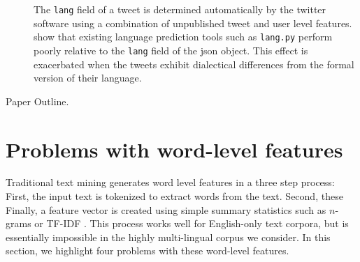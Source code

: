 \documentclass[sigconf,10pt]{acmart}
\newcommand{\str}[1]{\texttt{#1}}
\begin{document}
\begin{description}
The \str{lang} field of a tweet is determined automatically by the twitter software using a combination of unpublished tweet and user level features.
\citet{blodgett2016demographic} show that existing language prediction tools such as \str{lang.py} \citep{lui2012langid} perform poorly relative to the \str{lang} field of the json object.
This effect is exacerbated when the tweets exhibit dialectical differences from the formal version of their language.

\item[Paper Outline.]

\end{description}

%

\section{Problems with word-level features}

Traditional text mining generates word level features in a three step process:
First, the input text is tokenized to extract words from the text.
Second, these 
Finally, a feature vector is created using simple summary statistics such as $n$-grams or TF-IDF \citep{}.
This process works well for English-only text corpora,
but is essentially impossible in the highly multi-lingual corpus we consider.
In this section, we highlight four problems with these word-level features.
\end{document}
